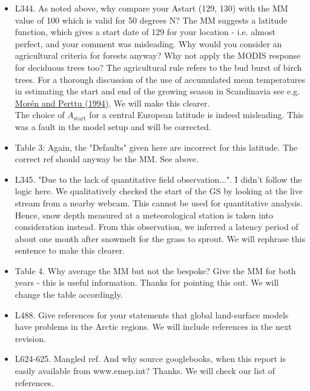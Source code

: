 \documentclass{scrartcl}
\begin{document}
\begin{itemize}
\item {\color{blue}L344. As noted above, why compare your Astart (129, 130) with the MM value of 100 which is valid for 50 degrees N? The MM suggests a latitude function, which gives a start date of 129 for your location - i.e. almost perfect, and your comment was misleading. Why would you consider an agricultural criteria for forests anyway? Why not apply the MODIS response for deciduous trees too?}
The agricultural rule refers to the bud burst of birch trees. For a thorough discussion of the use of accumulated mean temperatures in estimating the start and end of the growing season in Scandinavia see e.g. \href{https://pub.epsilon.slu.se/3910/1/SFS194.pdf}{Morén and Perttu (1994)}. We will make this clearer. \\The choice of $A_\mathrm{start}$ for a central European latitude is indeed misleading. This was a fault in the model setup and will be corrected.

\item {\color{blue}Table 3: Again, the "Defaults" given here are incorrect for this latitude. The correct ref should anyway be the MM.}
See above.

\item {\color{blue}L345. "Due to the lack of quantitative field observation...". I didn't follow the logic here.}
We qualitatively checked the start of the GS by looking at the live stream from a nearby webcam. This cannot be used for quantitative analysis. Hence, snow depth measured at a meteorological station is taken into consideration instead. From this observation, we inferred a latency period of about one month after snowmelt for the grass to sprout. We will rephrase this sentence to make this clearer.

\item {\color{blue}Table 4. Why average the MM but not the bespoke? Give the MM for both years - this is useful information.}
Thanks for pointing this out. We will change the table accordingly.

\item {\color{blue}L488. Give references for your statements that global land-surface models have problems in the Arctic regions.}
We will include references in the next revision.

\item {\color{blue}L624-625. Mangled ref. And why source googlebooks, when this report is easily available from www.emep.int?}
Thanks. We will check our list of references.


\end{itemize}
\end{document}
